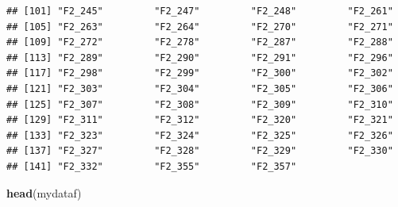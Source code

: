 \documentclass[]{article}
\newenvironment{Shaded}{\begin{snugshade}}{\end{snugshade}}
\newcommand{\KeywordTok}[1]{\textcolor[rgb]{0.13,0.29,0.53}{\textbf{#1}}}
\newcommand{\NormalTok}[1]{#1}
\begin{document}
\begin{verbatim}
## [101] "F2_245"         "F2_247"         "F2_248"         "F2_261"        
## [105] "F2_263"         "F2_264"         "F2_270"         "F2_271"        
## [109] "F2_272"         "F2_278"         "F2_287"         "F2_288"        
## [113] "F2_289"         "F2_290"         "F2_291"         "F2_296"        
## [117] "F2_298"         "F2_299"         "F2_300"         "F2_302"        
## [121] "F2_303"         "F2_304"         "F2_305"         "F2_306"        
## [125] "F2_307"         "F2_308"         "F2_309"         "F2_310"        
## [129] "F2_311"         "F2_312"         "F2_320"         "F2_321"        
## [133] "F2_323"         "F2_324"         "F2_325"         "F2_326"        
## [137] "F2_327"         "F2_328"         "F2_329"         "F2_330"        
## [141] "F2_332"         "F2_355"         "F2_357"
\end{verbatim}

\begin{Shaded}
\begin{Highlighting}[]
\KeywordTok{head}\NormalTok{(mydataf)}
\end{Highlighting}
\end{Shaded}
\end{document}
